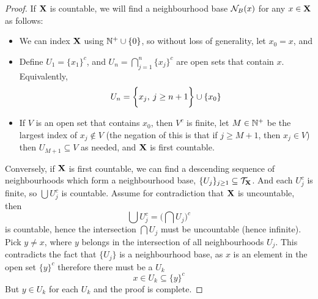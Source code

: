 \documentclass[../../main.tex]{subfiles}
\begin{document}
\begin{proof}
    If ${\mathbf{X}}$ is countable, we will find a neighbourhood base $\mathcal{N}_B({x})$ for any $x \in {\mathbf{X}}$ as follows: 
    \begin{itemize}
        \item We can index ${\mathbf{X}}$ using $\mathbb{N}^+\cup\{0\}$, so without loss of generality, let $x_0 = x$, and 
        \item Define $U_1 = \{x_1\}^c$, and $U_n = \bigcap_{j=1}^n \{x_j\}^c$ are open sets that contain $x$. Equivalently,
        \[
            U_n = \biggl\{{x_j,\: j\geq n+1}\biggr\}\cup\{x_0\}
        \]
        \item If $V$ is an open set that contains $x_0$, then $V^c$ is finite, let $M\in\mathbb{N}^+$ be the largest index of $x_j\notin V$ (the negation of this is that if $j\geq M+1$, then $x_j\in V$) then $U_{M+1}\subseteq V$ as needed, and ${\mathbf{X}}$ is first countable.
    \end{itemize}
    Conversely, if ${\mathbf{X}}$ is first countable, we can find a descending sequence of neighbourhoods which form a neighbourhood base, $\{U_j\}_{j\geq 1}\subseteq \mathcal{T}_{\mathbf{X}}$. And each $U_j^c$ is finite, so $\bigcup U_j^c$ is countable. Assume for contradiction that ${\mathbf{X}}$ is uncountable, then 
    \[
        \bigcup U_j^c = \biggl(\bigcap U_j\biggr)^c
    \]
    is countable, hence the intersection $\bigcap U_j$ must be uncountable (hence infinite). Pick $y\neq x$, where $y$ belongs in the intersection of all neighbourhoods $U_j$. This contradicts the fact that $\{U_j\}$ is a neighbourhood base, as $x$ is an element in the open set $\{y\}^c$ therefore there must be a $U_k$ 
    \[
        x\in U_k\subseteq \{y\}^c
    \]
    But $y\in U_k$ for each $U_k$ and the proof is complete.
\end{proof}
\newpage
\end{document}
